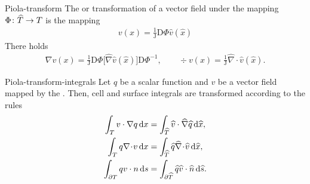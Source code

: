 \begin{Definition}{Piola-transform}
  The  or 
    transformation of a vector field under the mapping
  $\Phi\colon\widehat {T}\to T$ is the mapping
  \begin{gather}
    v(x) = \tfrac1{\mathrm J} \mathrm D\Phi \widehat v(\widehat x)
  \end{gather}
  There holds
  \begin{gather}
    \nabla v(x) = \tfrac1{\mathrm J} \mathrm D\Phi
    \bigl[\widehat\nabla \widehat v(\widehat x)\bigr] \mathrm D\Phi^{-1},
    \qquad
    \div v(x) = \tfrac1{\mathrm J} \widehat\nabla\!\cdot\!
    \widehat v(\widehat x).
  \end{gather}
\end{Definition}

\begin{Lemma}{Piola-transform-integrals}
  Let $q$ be a scalar function and $v$ be a 
  vector field mapped by the . Then, cell
  and surface integrals are transformed according to the rules
  \begin{gather}
    \begin{split}
      \int_{T} v \cdot \nabla q \,\mathrm{d} x
      &= \int_{\widehat {T}} \widehat v \cdot \widehat \nabla \widehat q \,\mathrm{d} \widehat x,
      \\
      \int_{T} q \nabla\!\cdot\! v \,\mathrm{d} x
      &= \int_{\widehat {T}} \widehat q \widehat \nabla\!\cdot\! \widehat v \,\mathrm{d} \widehat x,
      \\
      \int_{\partial T} q v\cdot n \,\mathrm{d} s
      &= \int_{\partial\widehat {T}} \widehat q \widehat v\cdot\widehat {n} \,\mathrm{d} \widehat s.
    \end{split}
  \end{gather}
\end{Lemma}

